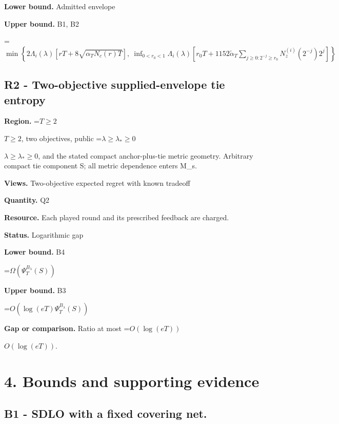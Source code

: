 \documentclass[10pt,a4paper]{article}
\newcommand{\AtlasMath}[1]{\par\begingroup\centering\setbox0=\hbox{$\displaystyle #1$}\ifdim\wd0>1.4\linewidth\typeout{ATLAS WIDE FORMULA: \the\wd0}\fi\ifdim\wd0>\linewidth\resizebox{\linewidth}{!}{\box0}\else\box0\fi\par\endgroup}
\newcommand{\AtlasInlineMath}[1]{\begingroup\setbox0=\hbox{$#1$}\ifdim\wd0>.4\linewidth\endgroup\AtlasMath{#1}\else\endgroup$#1$\fi}
\begin{document}
\textbf{Lower bound.} Admitted envelope



\textbf{Upper bound.} B1, B2



\AtlasMath{\min\left\{2\Lambda_i(\lambda)\left[rT+8\sqrt{\alpha_TN_c(r)T}\right],\ \inf_{0<r_0<1}\Lambda_i(\lambda)\left[r_0T+1152\widetilde\alpha_T\sum_{j\ge0:2^{-j}\ge r_0}N_z^{(i)}(2^{-j})2^j\right]\right\}}


\subsection{R2 - Two-objective supplied-envelope tie entropy}


\textbf{Region.} \AtlasInlineMath{T\ge2}, two objectives, public \AtlasInlineMath{\lambda\ge\lambda_*\ge0}, and the stated compact anchor-plus-tie metric geometry. Arbitrary compact tie component S; all metric dependence enters M\_s.



\textbf{Views.} Two-objective expected regret with known tradeoff



\textbf{Quantity.} Q2



\textbf{Resource.} Each played round and its prescribed feedback are charged.



\textbf{Status.} Logarithmic gap



\textbf{Lower bound.} B4



\AtlasMath{\Omega(\Psi_T^{B_\lambda}(S))}


\textbf{Upper bound.} B3



\AtlasMath{O(\log(eT)\Psi_T^{B_\lambda}(S))}


\textbf{Gap or comparison.} Ratio at most \AtlasInlineMath{O(\log(eT))}.



\section{4. Bounds and supporting evidence}


\subsection{B1 - SDLO with a fixed covering net.}
\end{document}
